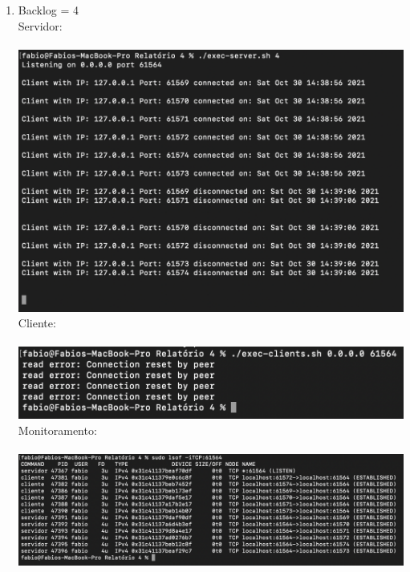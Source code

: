 \documentclass[12pt,a4paper]{report}
\begin{document}
\begin{enumerate}
\begin{enumerate}
        \item Backlog = 4\\
        Servidor:\\\\
        \includegraphics[width=1\textwidth]{images/servidor-backlog-4.png}
        Cliente:\\\\
        \includegraphics[width=1\textwidth]{images/cliente-backlog-4.png}
        Monitoramento:\\\\
        \includegraphics[width=1\textwidth]{images/lsof-backlog-4.png}
        

\end{enumerate}
\end{enumerate}
\end{document}
